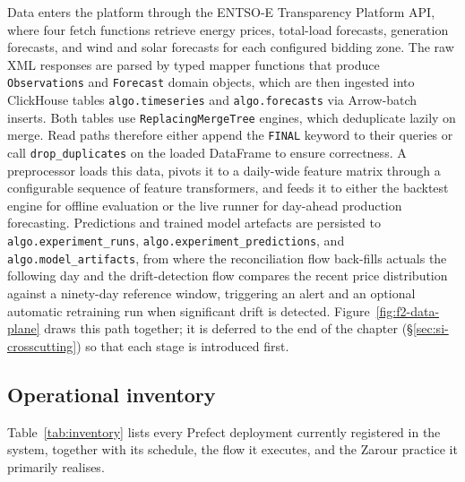 Data enters the platform through the ENTSO-E Transparency Platform API, where
four fetch functions retrieve energy prices, total-load forecasts, generation
forecasts, and wind and solar forecasts for each configured bidding zone.
The raw XML responses are parsed by typed mapper functions that produce
\texttt{Observations} and \texttt{Forecast} domain objects, which are then
ingested into ClickHouse tables \texttt{algo.timeseries} and
\texttt{algo.forecasts} via Arrow-batch inserts. Both tables use
\texttt{ReplacingMergeTree} engines, which deduplicate lazily on merge. Read
paths therefore either append the \texttt{FINAL} keyword to their queries or
call \texttt{drop\_duplicates} on the loaded DataFrame to ensure correctness. A
preprocessor loads this data, pivots it to a daily-wide feature matrix through a
configurable sequence of feature transformers, and feeds it to either the
backtest engine for offline evaluation or the live runner for day-ahead
production forecasting. Predictions and trained model artefacts are persisted to
\texttt{algo.experiment\_runs}, \texttt{algo.experiment\_predictions}, and
\texttt{algo.model\_artifacts}, from where the reconciliation flow back-fills
actuals the following day and the drift-detection flow compares the recent price
distribution against a ninety-day reference window, triggering an alert and an
optional automatic retraining run when significant drift is detected. Figure~\ref{fig:f2-data-plane} draws this
path together; it is deferred to the end of the chapter
(\S\ref{sec:si-crosscutting}) so that each stage is introduced first.


\subsection{Operational inventory}

Table~\ref{tab:inventory} lists every Prefect deployment currently registered
in the system, together with its schedule, the flow it executes, and the
Zarour practice it primarily realises.


